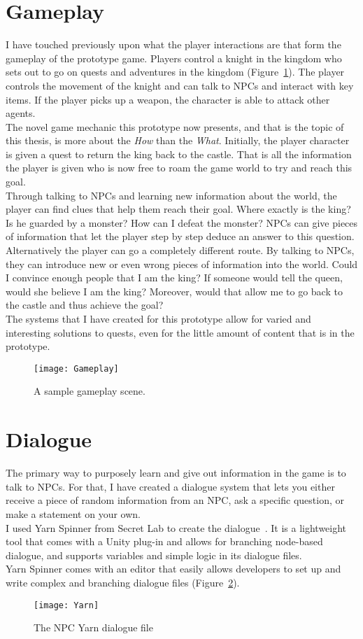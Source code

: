 \section{Gameplay}
I have touched previously upon what the player interactions are that form the gameplay of the prototype game. Players control a knight in the kingdom who sets out to go on quests and adventures in the kingdom (Figure~\ref{fig:gameplay}). The player controls the movement of the knight and can talk to NPCs and interact with key items. If the player picks up a weapon, the character is able to attack other agents.\\
The novel game mechanic this prototype now presents, and that is the topic of this thesis, is more about the \textit{How} than the \textit{What}. Initially, the player character is given a quest to return the king back to the castle. That is all the information the player is given who is now free to roam the game world to try and reach this goal.\\
Through talking to NPCs and learning new information about the world, the player can find clues that help them reach their goal. Where exactly is the king? Is he guarded by a monster? How can I defeat the monster? NPCs can give pieces of information that let the player step by step deduce an answer to this question.\\
Alternatively the player can go a completely different route. By talking to NPCs, they can introduce new or even wrong pieces of information into the world. Could I convince enough people that I am the king? If someone would tell the queen, would she believe I am the king? Moreover, would that allow me to go back to the castle and thus achieve the goal?\\
The systems that I have created for this prototype allow for varied and interesting solutions to quests, even for the little amount of content that is in the prototype.
\begin{figure}
	\centering
	\texttt{[image: Gameplay]}
	\caption{A sample gameplay scene.}
	\label{fig:gameplay}
\end{figure}
\section{Dialogue}
The primary way to purposely learn and give out information in the game is to talk to NPCs. For that, I have created a dialogue system that lets you either receive a piece of random information from an NPC, ask a specific question, or make a  statement on your own.\\
I used Yarn Spinner from Secret Lab to create the dialogue~\cite{Secret2021}. It is a lightweight tool that comes with a Unity plug-in and allows for branching node-based dialogue, and supports variables and simple logic in its dialogue files.\\
Yarn Spinner comes with an editor that easily allows developers to set up and write complex and branching dialogue files (Figure~\ref{fig:yarn}).
\begin{figure}
	\centering
	\texttt{[image: Yarn]}
	\caption{The NPC Yarn dialogue file}
	\label{fig:yarn}
\end{figure}
